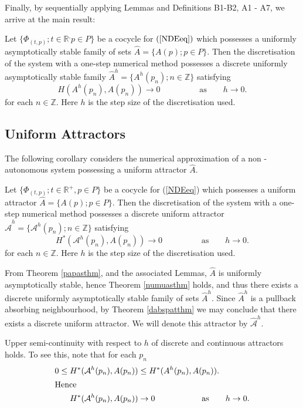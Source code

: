 Finally, by sequentially applying Lemmas and Definitions B1-B2, A1 - A7, we
arrive at the main result:

\begin{therm}
\label{numuasthm} Let $\{ \Phi_{(t, p)}; t \in \mathbb{R}^, p \in P \}$ be a
cocycle for $(\ref{NDEeq})$ which possesses a uniformly asymptotically stable
family of sets $\hat{A} = \{ A(p) ; p \in P\}$. Then the
discretisation of the system with a one-step numerical method possesses a
discrete uniformly asymptotically stable family $\hat{A}^h = \{ A^h(p_n) ; n \in
\mathbb{Z}\}$ satisfying
\begin{equation}
\label{coneq}
 H( A^h(p_n), A(p_n)) \to 0 \hspace{2cm} \text{as} \qquad h \to 0.
\end{equation}
for each $n \in \mathbb{Z}$. Here $h$ is the step size of the discretisation
used.
\end{therm}

\subsection{Uniform Attractors}

The following corollary considers the numerical approximation of a
non - autonomous system possessing a uniform attractor $\hat{A}$.

\begin{cor}\label{coruatt}
Let $\{ \Phi_{(t, p)}; t \in \mathbb{R}^+, p \in P \}$ be a cocycle
for (\ref{NDEeq}) which possesses a uniform attractor $\hat{A} =
\{ A(p) ; p \in P\}$. Then the discretisation of the system with a
one-step numerical method possesses a discrete uniform attractor
$\hat{\mathcal{A}}^h = \{ \mathcal{A}^h(p_n) ; n \in \mathbb{Z} \}$ satisfying
\[ H^*( \mathcal{A}^h(p_n), A(p_n)) \to 0 \hspace{2cm} \text{as}
  \qquad h \to 0. \]
for each $n \in \mathbb{Z}$. Here $h$ is the step size of the
discretisation used.
\end{cor}
\begin{prf}
From Theorem \ref{papasthm}, and the associated Lemmas, $\hat{A}$
is uniformly asymptotically stable, hence Theorem \ref{numuasthm}
holds, and thus there exists a discrete uniformly asymptotically
stable family of sets $\hat{A}^h$. Since $\hat{A}^h$ is a
pullback absorbing neighbourhood, by Theorem \ref{dabspatthm} we
may conclude that there exists a discrete uniform attractor. We
will denote this attractor by $\hat{\mathcal{A}}^h$.

Upper semi-continuity with respect to $h$ of discrete and continuous
attractors holds. To see this, note that for each $p_n$
\begin{align*}
  0 \leq H^*(\mathcal{A}^h(p_n), A(p_n)) &\leq H^*(A^h(p_n), A(p_n)). \\
\intertext{Hence}
  H^*(\mathcal{A}^h(p_n), A(p_n)) & \to 0 \hspace{2cm} \text{as} \qquad h \to 0. \\
\end{align*}
\end{prf}

\endinput
